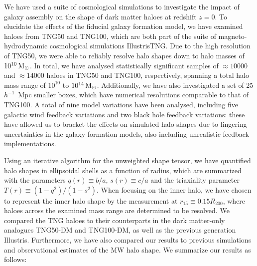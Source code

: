 \documentclass[fleqn,usenatbib]{mnras}
\def\msun{\,\rm M_{\odot}}
\begin{document}
We have used a suite of cosmological simulations to investigate the impact of galaxy assembly on the shape of dark matter haloes at redshift $z=0$.
To elucidate the effects of the fiducial galaxy formation model, we have examined haloes from TNG50 and TNG100, which are both part of the suite of magneto-hydrodynamic cosmological simulations IllustrisTNG.
Due to the high resolution of TNG50, we were able to reliably resolve halo shapes down to halo masses of $10^{10} \msun$.
In total, we have analysed  statistically significant samples of ${\approx}10000$ and ${\approx}14000$ haloes in TNG50 and TNG100, respectively, spanning a total halo mass range of $10^{10}$ to $10^{14} \msun$.
Additionally, we have also investigated a set of 25$h^{-1}$~Mpc smaller boxes, which have numerical resolutions comparable to that of TNG100.
A total of nine model variations have been analysed, including five galactic wind feedback variations and two black hole feedback variations: these have allowed us to bracket the effects on simulated halo shapes due to lingering uncertainties in the galaxy formation models, also including unrealistic feedback implementations.

Using an iterative algorithm for the unweighted shape tensor, we have quantified halo shapes in ellipsoidal shells as a function of radius, which are summarized with the parameters $q(r) \equiv b/a$, $s(r) \equiv c/a$ and the triaxiality parameter $T(r) \equiv (1-q^2)/(1-s^2)$.
When focusing on the inner halo, we have chosen to represent the inner halo shape by the measurement at $r_{15} \equiv 0.15R_{200}$, where haloes across the examined mass range are determined to be resolved.
We compared the TNG haloes to their counterparts in the dark matter-only analogues TNG50-DM and TNG100-DM, as well as the previous generation Illustris.
Furthermore, we have also compared our results to previous simulations and observational estimates of the MW halo shape.
We summarize our results as follows:
\end{document}
